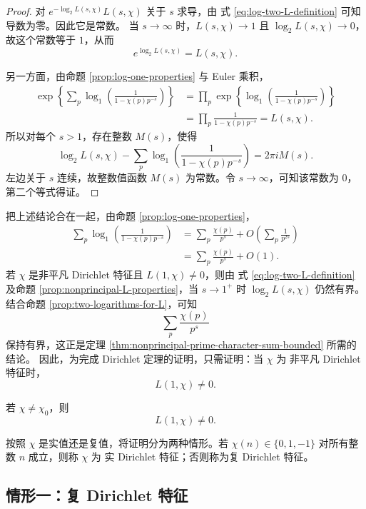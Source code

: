 \begin{proof}
	对 $e^{-\log_2L(s,\chi)}L(s,\chi)$ 关于 $s$ 求导，由
式 \eqref{eq:log-two-L-definition} 可知导数为零。因此它是常数。
当 $s\to\infty$ 时，$L(s,\chi)\to1$ 且
$\log_2L(s,\chi)\to0$，故这个常数等于 $1$，从而
\[
	e^{\log_2L(s,\chi)}=L(s,\chi).
\]

	另一方面，由命题 \ref{prop:log-one-properties} 与 Euler 乘积，
	\[
	\begin{aligned}
	\exp\left\{
	\sum_p\log_1\left(
	\frac1{1-\chi(p)p^{-s}}
	\right)
	\right\}
	&=\prod_p
	\exp\left\{
	\log_1\left(
	\frac1{1-\chi(p)p^{-s}}
	\right)
	\right\}\\
	&=\prod_p\frac1{1-\chi(p)p^{-s}}
	=L(s,\chi).
	\end{aligned}
	\]
	所以对每个 $s>1$，存在整数 $M(s)$，使得
	\[
	\log_2L(s,\chi)
	-\sum_p\log_1\left(
	\frac1{1-\chi(p)p^{-s}}
	\right)
	=2\pi iM(s).
	\]
	左边关于 $s$ 连续，故整数值函数 $M(s)$ 为常数。令
$s\to\infty$，可知该常数为 $0$，第二个等式得证。
\end{proof}

把上述结论合在一起，由命题 \ref{prop:log-one-properties}，
\[
\begin{aligned}
\sum_p\log_1\left(
\frac1{1-\chi(p)p^{-s}}
\right)
&=\sum_p\frac{\chi(p)}{p^s}
+O\left(\sum_p\frac1{p^{2s}}\right)\\
&=\sum_p\frac{\chi(p)}{p^s}+O(1).
\end{aligned}
\]
若 $\chi$ 是非平凡 Dirichlet 特征且 $L(1,\chi)\neq0$，则由
式 \eqref{eq:log-two-L-definition} 及命题
\ref{prop:nonprincipal-L-properties}，当 $s\to1^+$ 时
$\log_2L(s,\chi)$ 仍然有界。结合命题
\ref{prop:two-logarithms-for-L}，可知
\[
\sum_p\frac{\chi(p)}{p^s}
\]
保持有界，这正是定理
\ref{thm:nonprincipal-prime-character-sum-bounded} 所需的结论。
因此，为完成 Dirichlet 定理的证明，只需证明：当 $\chi$ 为
非平凡 Dirichlet 特征时，
\[
L(1,\chi)\neq0.
\]

\begin{theorem}\label{thm:dirichlet-L-nonvanishing-at-one}
	若 $\chi\neq\chi_0$，则
	\[
	L(1,\chi)\neq0.
	\]
\end{theorem}

按照 $\chi$ 是实值还是复值，将证明分为两种情形。若
$\chi(n)\in\{0,1,-1\}$ 对所有整数 $n$ 成立，则称 $\chi$ 为
实 Dirichlet 特征；否则称为复 Dirichlet 特征。

\subsection*{情形一：复 Dirichlet 特征}

